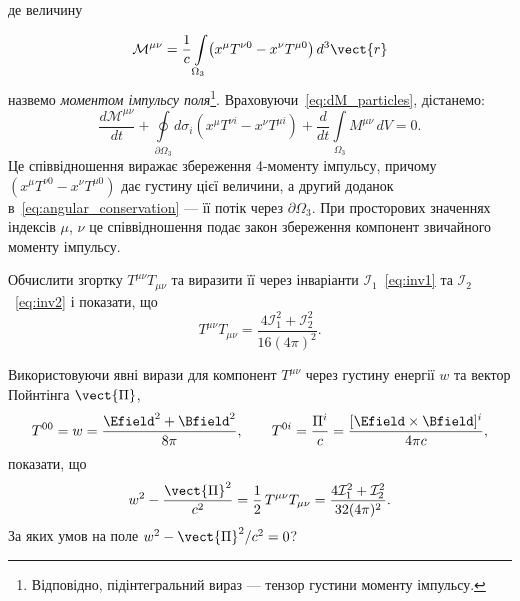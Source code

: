 де величину

\begin{equation*}
    \mathcal{M}^{\mu\nu}
    = \frac{1}{c}\int\limits_{\Omega_3}\!\left(x^{\mu}T^{\nu 0} - x^{\nu}T^{\mu 0}\right)d^3\vect{r}
\end{equation*}
%
назвемо \emph{моментом імпульсу поля}\footnote{Відповідно, підінтегральний вираз --- тензор густини моменту імпульсу.}.
Враховуючи~\eqref{eq:dM_particles}, дістанемо:
\begin{equation}\label{eq:angular_conservation}
    \frac{d\mathcal{M}^{\mu\nu}}{dt}
    + \oint\limits_{\partial\Omega_3}d\sigma_i\!\left(x^{\mu}T^{\nu i} - x^{\nu}T^{\mu i}\right)
    + \frac{d}{dt}\int\limits_{\Omega_3}M^{\mu\nu}\,dV = 0.
\end{equation}
Це співвідношення виражає збереження 4-моменту імпульсу, причому
$(x^{\mu}T^{\nu 0}-x^{\nu}T^{\mu 0})$ дає густину цієї величини, а другий доданок в~\eqref{eq:angular_conservation} ---
її потік через $\partial\Omega_3$. При просторових значеннях індексів $\mu$, $\nu$ це співвідношення подає закон
збереження компонент звичайного моменту імпульсу.

\begin{problem}%
Обчислити згортку $T^{\mu\nu}T_{\mu\nu}$ та виразити її через інваріанти
$\mathcal{I}_1$~\eqref{eq:inv1} та $\mathcal{I}_2$~\eqref{eq:inv2} і показати, що
\begin{equation*}
    T^{\mu\nu}T_{\mu\nu} = \frac{4\mathcal{I}_1^2 + \mathcal{I}_2^2}{16(4\pi)^2}.
\end{equation*}
\end{problem}

\begin{problem}%
Використовуючи явні вирази для компонент $T^{\mu\nu}$ через
густину енергії $w$ та вектор Пойнтінга $\vect{\Pi}$,
\begin{equation*}
    T^{00} = w = \frac{\Efield^2 + \Bfield^2}{8\pi},
    \qquad
    T^{0i} = \frac{\Pi^i}{c} = \frac{[\Efield\times\Bfield]^i}{4\pi c},
\end{equation*}
показати, що
\begin{equation*}
    w^2 - \frac{\vect{\Pi}^2}{c^2} = \frac{1}{2}\,T^{\mu\nu}T_{\mu\nu}
    = \frac{4\mathcal{I}_1^2 + \mathcal{I}_2^2}{32(4\pi)^2}.
\end{equation*}
За яких умов на поле $w^2 - \vect{\Pi}^2/c^2 = 0$?
\end{problem}